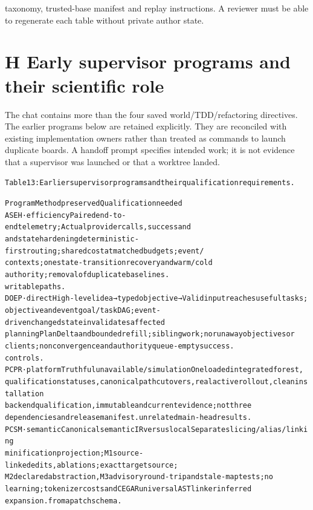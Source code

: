 taxonomy, trusted-base manifest and replay instructions. A reviewer must be able to regenerate each
table without private author state.

\section*{H Early supervisor programs and their scientific role}
The chat contains more than the four saved world/TDD/refactoring directives. The earlier programs
below are retained explicitly. They are reconciled with existing implementation owners rather than
treated as commands to launch duplicate boards. A handoff prompt specifies intended work; it is not
evidence that a supervisor was launched or that a worktree landed.

\begingroup\fontsize{7}{8.4}\selectfont
\begin{alltt}
Table 13: Earlier supervisor programs and their qualification requirements.
\end{alltt}\endgroup

\begingroup\fontsize{7}{8.4}\selectfont
\begin{alltt}
Program                  Method preserved                           Qualification needed
ASEH · efficiency        Paired end-to-end telemetry;               Actual provider calls, success and
and state hardening      deterministic-first routing; shared        cost at matched budgets; event/
                         contexts; one state-transition             recovery and warm/cold
                         authority; removal of duplicate            baselines.
                         writable paths.
DOEP · direct            High-level idea → typed objective →        Valid input reaches useful tasks;
objective and event      goal/task DAG; event-driven                changed state invalidates affected
planning                 PlanDelta and bounded refill; sibling      work; no runaway objectives or
                         clients; nonconvergence and authority      queue-empty success.
                         controls.
PCPR · platform          Truthful unavailable/simulation            One loaded integrated forest,
qualification            statuses, canonical path cutovers, real    active rollout, clean installation
                         backend qualification, immutable           and current evidence; not three
                         dependencies and release manifest.         unrelated main-head results.
PCSM · semantic          Canonical semantic IR versus local         Separate slicing/alias/linking
minification             projection; M1 source-linked edits,        ablations; exact target source;
                         M2 declared abstraction, M3 advisory       round-trip and stale-map tests; no
                         learning; tokenizer costs and CEGAR        universal AST linker inferred
                         expansion.                                 from a patch schema.
\end{alltt}\endgroup


